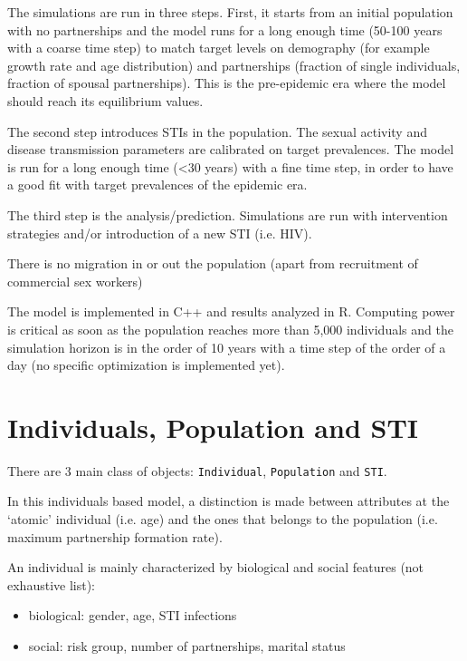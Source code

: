\documentclass[11pt, onecolumn]{article}
\newcommand{\ttt}[1]{\texttt{#1}}
\begin{document}
The simulations are run in three steps. First, it starts from an initial population with no partnerships and the model runs for a long enough time (50-100 years with a coarse time step) to match target levels on demography (for example growth rate and age distribution) and partnerships (fraction of single individuals, fraction of spousal partnerships). This is the pre-epidemic era where the model should reach its equilibrium values.

The second step introduces STIs in the population. The sexual activity and disease transmission parameters are calibrated on target prevalences. The model is run for a long enough time (<30 years) with a fine time step, in order to have a good fit with target prevalences of the epidemic era. 

The third step is the analysis/prediction. Simulations are run with intervention strategies and/or introduction of a new STI (i.e. HIV).

There is no migration in or out the population (apart from recruitment of commercial sex workers)

The model is implemented in C++ and results analyzed in R. Computing power is critical as soon as the population reaches more than 5,000 individuals and the simulation horizon is in the order of 10 years with a time step of the order of a day (no specific optimization is implemented yet).




\section{Individuals, Population and STI}

There are 3 main class of objects: \ttt{Individual}, \ttt{Population} and \ttt{STI}.

In this individuals based model, a distinction is made between attributes at the `atomic' individual (i.e. age) and the ones that belongs to the population (i.e. maximum partnership formation rate). 

An individual is mainly characterized by biological and social features (not exhaustive list): 
\begin{itemize}
\item biological: gender, age, STI infections
\item social: risk group, number of partnerships, marital status
\end{itemize}
\end{document}
